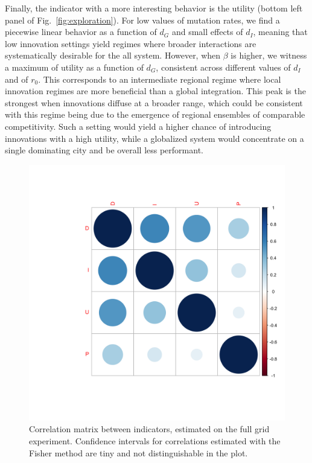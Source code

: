 \documentclass[letterpaper]{article}
\begin{document}
Finally, the indicator with a more interesting behavior is the utility (bottom left panel of Fig.~\ref{fig:exploration}). For low values of mutation rates, we find a piecewise linear behavior as a function of $d_G$ and small effects of $d_I$, meaning that low innovation settings yield regimes where broader interactions are systematically desirable for the all system. However, when $\beta$ is higher, we witness a maximum of utility as a function of $d_G$, consistent across different values of $d_I$ and of $r_0$. This corresponds to an intermediate regional regime where local innovation regimes are more beneficial than a global integration. This peak is the strongest when innovations diffuse at a broader range, which could be consistent with this regime being due to the emergence of regional ensembles of comparable competitivity. Such a setting would yield a higher chance of introducing innovations with a high utility, while a globalized system would concentrate on a single dominating city and be overall less performant.


\begin{figure}[t]
	\centering
	\includegraphics[width=\linewidth,trim={6cm 6cm 0 6cm}]{figures/corrmat_indics.png}
	\caption{Correlation matrix between indicators, estimated on the full grid experiment. Confidence intervals for correlations estimated with the Fisher method are tiny and not distinguishable in the plot.\label{fig:cormat}}
\end{figure}
\end{document}
